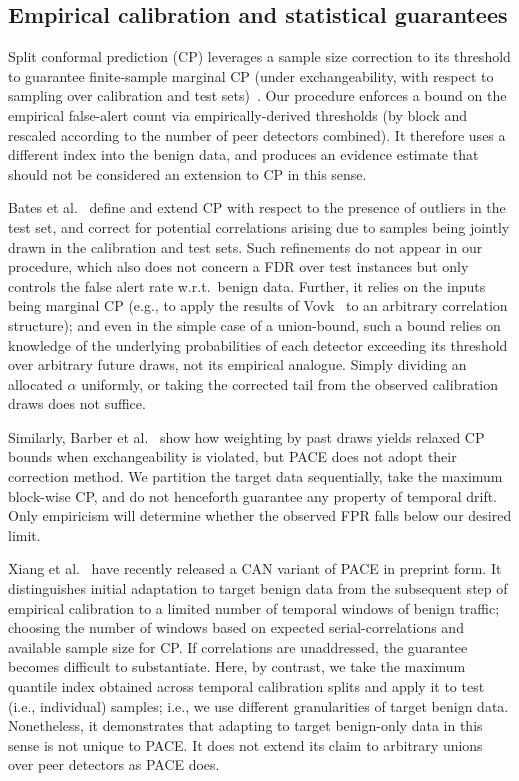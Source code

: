 \subsection{Empirical calibration and statistical guarantees} 
Split conformal prediction (CP) leverages a sample size correction to its threshold to guarantee finite-sample marginal CP (under exchangeability, with respect to sampling over calibration and test sets)~\cite{angelopoulos2023conformal}. Our procedure enforces a bound on the empirical false-alert count via empirically-derived thresholds (by block and rescaled according to the number of peer detectors combined). It therefore uses a different index into the benign data, and produces an evidence estimate that should not be considered an extension to CP in this sense.

Bates et al.~\cite{bates2023outliers} define and extend CP with respect to the presence of outliers in the test set, and correct for potential correlations arising due to samples being jointly drawn in the calibration and test sets. Such refinements do not appear in our procedure, which also does not concern a FDR over test instances but only controls the false alert rate w.r.t.~benign data. Further, it relies on the inputs being marginal CP (e.g., to apply the results of Vovk~\cite{vovk2020averaging} to an arbitrary correlation structure); and even in the simple case of a union-bound, such a bound relies on knowledge of the underlying probabilities of each detector exceeding its threshold over arbitrary future draws, not its empirical analogue. Simply dividing an allocated $\alpha$ uniformly, or taking the corrected tail from the observed calibration draws does not suffice.

Similarly, Barber et al.~\cite{barber2023nonexchangeable} show how weighting by past draws yields relaxed CP bounds when exchangeability is violated, but PACE does not adopt their correction method. We partition the target data sequentially, take the maximum block-wise CP, and do not henceforth guarantee any property of temporal drift. Only empiricism will determine whether the observed FPR falls below our desired limit.

Xiang et al.~\cite{xiang2026can} have recently released a CAN variant of PACE in preprint form. It distinguishes initial adaptation to target benign data from the subsequent step of empirical calibration to a limited number of temporal windows of benign traffic; choosing the number of windows based on expected serial-correlations and available sample size for CP. If correlations are unaddressed, the guarantee becomes difficult to substantiate. Here, by contrast, we take the maximum quantile index obtained across temporal calibration splits and apply it to test (i.e., individual) samples; i.e., we use different granularities of target benign data. Nonetheless, it demonstrates that adapting to target benign-only data in this sense is not unique to PACE. It does not extend its claim to arbitrary unions over peer detectors as PACE does.

